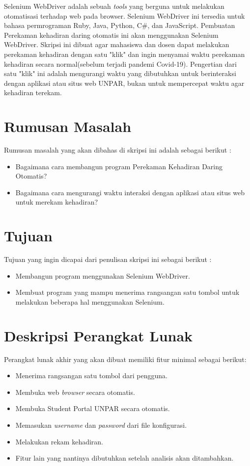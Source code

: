 \documentclass[a4paper,twoside]{article}
\begin{document}
 Selenium WebDriver adalah sebuah \textit{tools} yang berguna untuk melakukan otomatisasi terhadap web pada browser. Selenium WebDriver ini tersedia untuk bahasa permrograman Ruby, Java, Python, C\#, dan JavaScript. Pembuatan Perekaman kehadiran daring otomatis ini akan menggunakan Selenium WebDriver. Skripsi ini dibuat agar mahasiswa dan dosen dapat melakukan perekaman kehadiran dengan satu "klik" dan ingin menyamai waktu perekaman kehadiran secara normal(sebelum terjadi pandemi Covid-19). Pengertian dari satu "klik" ini adalah mengurangi waktu yang dibutuhkan untuk berinteraksi dengan aplikasi atau situs web UNPAR, bukan untuk mempercepat waktu agar kehadiran terekam. 

\section{Rumusan Masalah}
Rumusan masalah yang akan dibahas di skripsi ini adalah sebagai berikut :
\begin{itemize}
	\item Bagaimana cara membangun program Perekaman Kehadiran Daring Otomatis?
	\item Bagaimana cara mengurangi waktu interaksi dengan aplikasi atau situs web untuk merekam kehadiran?
	
\end{itemize}
\section{Tujuan}
Tujuan yang ingin dicapai dari penulisan skripsi ini sebagai berikut :
\begin{itemize}
	\item Membangun program menggunakan Selenium WebDriver.
	\item Membuat program yang mampu menerima rangsangan satu tombol untuk melakukan beberapa hal menggunakan Selenium.
	
\end{itemize}



\section{Deskripsi Perangkat Lunak}
Perangkat lunak akhir yang akan dibuat memiliki fitur minimal sebagai berikut:
\begin{itemize}
	\item Menerima rangsangan satu tombol dari pengguna.
	\item Membuka web \textit{browser} secara otomatis.
	\item Membuka Student Portal UNPAR secara otomatis.
	\item Memasukan \textit{username} dan \textit{password} dari file konfigurasi.
	\item Melakukan rekam kehadiran.
	\item Fitur lain yang nantinya dibutuhkan setelah analisis akan ditambahkan. 
\end{itemize}
\end{document}
